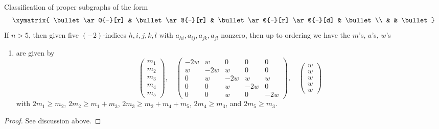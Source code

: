 \begin{lemma}
\label{lemma-D5}
Classification of proper subgraphs of the form
$$
\xymatrix{
\bullet \ar@{-}[r] & \bullet \ar@{-}[r] &
\bullet \ar@{-}[r] \ar@{-}[d] & \bullet \\
& & \bullet
}
$$
If $n > 5$, then given five $(-2)$-indices $h, i, j, k, l$
with $a_{hi}, a_{ij}, a_{jk}, a_{jl}$ nonzero, then up
to ordering we have the $m$'s, $a$'s, $w$'s
\begin{enumerate}
\item
\label{item-D5}
are given by
$$
\left(
\begin{matrix}
m_1 \\
m_2 \\
m_3 \\
m_4 \\
m_5
\end{matrix}
\right),
\quad
\left(
\begin{matrix}
-2w & w & 0 & 0 & 0 \\
w & -2w & w & 0 & 0 \\
0 & w & -2w & w & w \\
0 & 0 & w & -2w & 0 \\
0 & 0 & w & 0 & -2w
\end{matrix}
\right),
\quad
\left(
\begin{matrix}
w \\
w \\
w \\
w \\
w
\end{matrix}
\right)
$$
with $2m_1 \geq m_2$, $2m_2 \geq m_1 + m_3$, $2m_3 \geq m_2 + m_4 + m_5$,
$2m_4 \geq m_3$, and $2m_5 \geq m_3$.
\end{enumerate}
\end{lemma}

\begin{proof}
See discussion above.
\end{proof}

